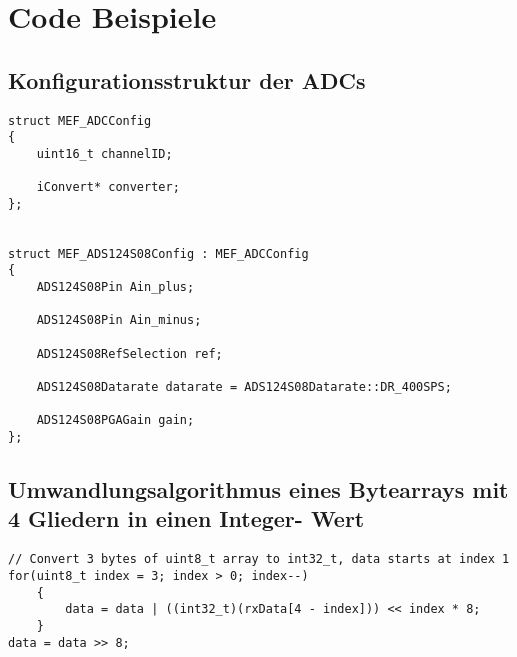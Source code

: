 \section{Code Beispiele}
\label{sec:sode-snippets}

\subsection{Konfigurationsstruktur der ADCs}
\label{subsec:conf-structs-adc}

\begin{lstlisting}[caption={Konfigurationsstruktur der ADCs mit Interface(MEF\_ADCConfig) und der Erweiterung für den externen ADC (MEF\_ADS124S08Config) }, label=lst:adc-conf-structs]
struct MEF_ADCConfig
{
	uint16_t channelID;

	iConvert* converter;
};


struct MEF_ADS124S08Config : MEF_ADCConfig
{
	ADS124S08Pin Ain_plus;

	ADS124S08Pin Ain_minus;

	ADS124S08RefSelection ref;

	ADS124S08Datarate datarate = ADS124S08Datarate::DR_400SPS;

	ADS124S08PGAGain gain;
};
\end{lstlisting}

\newpage
\subsection{Umwandlungsalgorithmus eines Bytearrays mit 4 Gliedern in einen Integer- Wert}
\label{subsec:array-to-int-code}
\begin{lstlisting}[caption={Konvertierungsalgorithmus}, label=lst:array-to-int-code]
// Convert 3 bytes of uint8_t array to int32_t, data starts at index 1
for(uint8_t index = 3; index > 0; index--)
	{
		data = data | ((int32_t)(rxData[4 - index])) << index * 8;
	}
data = data >> 8;
\end{lstlisting}


